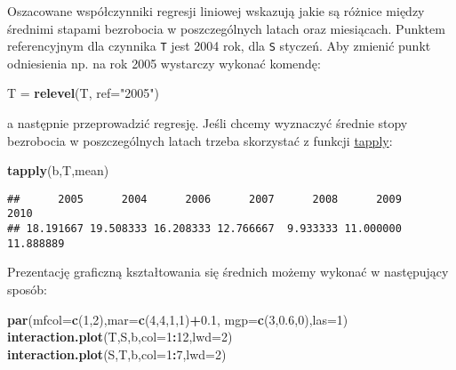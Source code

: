 \documentclass[polish,]{book}
\newenvironment{Shaded}{\begin{snugshade}}{\end{snugshade}}
\newcommand{\DataTypeTok}[1]{\textcolor[rgb]{0.13,0.29,0.53}{#1}}
\newcommand{\DecValTok}[1]{\textcolor[rgb]{0.00,0.00,0.81}{#1}}
\newcommand{\FloatTok}[1]{\textcolor[rgb]{0.00,0.00,0.81}{#1}}
\newcommand{\KeywordTok}[1]{\textcolor[rgb]{0.13,0.29,0.53}{\textbf{#1}}}
\newcommand{\NormalTok}[1]{#1}
\newcommand{\OperatorTok}[1]{\textcolor[rgb]{0.81,0.36,0.00}{\textbf{#1}}}
\newcommand{\StringTok}[1]{\textcolor[rgb]{0.31,0.60,0.02}{#1}}
\begin{document}
Oszacowane współczynniki regresji liniowej wskazują jakie są różnice między średnimi stapami bezrobocia w poszczególnych latach oraz miesiącach. Punktem referencyjnym dla czynnika \texttt{T} jest 2004 rok, dla \texttt{S} styczeń. Aby zmienić punkt odniesienia np. na rok 2005 wystarczy wykonać komendę:

\begin{Shaded}
\begin{Highlighting}[]
\NormalTok{T =}\StringTok{ }\KeywordTok{relevel}\NormalTok{(T, }\DataTypeTok{ref=}\StringTok{"2005"}\NormalTok{)}
\end{Highlighting}
\end{Shaded}

a następnie przeprowadzić regresję. Jeśli chcemy wyznaczyć średnie stopy bezrobocia
w poszczególnych latach trzeba skorzystać z funkcji \href{https://rdrr.io/r/base/tapply.html}{tapply}:

\begin{Shaded}
\begin{Highlighting}[]
\KeywordTok{tapply}\NormalTok{(b,T,mean)}
\end{Highlighting}
\end{Shaded}

\begin{verbatim}
##      2005      2004      2006      2007      2008      2009      2010 
## 18.191667 19.508333 16.208333 12.766667  9.933333 11.000000 11.888889
\end{verbatim}

Prezentację graficzną kształtowania się średnich możemy wykonać w następujący
sposób:

\begin{Shaded}
\begin{Highlighting}[]
\KeywordTok{par}\NormalTok{(}\DataTypeTok{mfcol=}\KeywordTok{c}\NormalTok{(}\DecValTok{1}\NormalTok{,}\DecValTok{2}\NormalTok{),}\DataTypeTok{mar=}\KeywordTok{c}\NormalTok{(}\DecValTok{4}\NormalTok{,}\DecValTok{4}\NormalTok{,}\DecValTok{1}\NormalTok{,}\DecValTok{1}\NormalTok{)}\OperatorTok{+}\FloatTok{0.1}\NormalTok{, }\DataTypeTok{mgp=}\KeywordTok{c}\NormalTok{(}\DecValTok{3}\NormalTok{,}\FloatTok{0.6}\NormalTok{,}\DecValTok{0}\NormalTok{),}\DataTypeTok{las=}\DecValTok{1}\NormalTok{)}
\KeywordTok{interaction.plot}\NormalTok{(T,S,b,}\DataTypeTok{col=}\DecValTok{1}\OperatorTok{:}\DecValTok{12}\NormalTok{,}\DataTypeTok{lwd=}\DecValTok{2}\NormalTok{)}
\KeywordTok{interaction.plot}\NormalTok{(S,T,b,}\DataTypeTok{col=}\DecValTok{1}\OperatorTok{:}\DecValTok{7}\NormalTok{,}\DataTypeTok{lwd=}\DecValTok{2}\NormalTok{)}
\end{Highlighting}
\end{Shaded}
\end{document}
